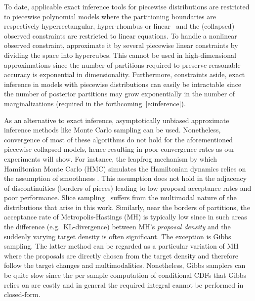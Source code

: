 \documentclass[letterpaper]{article}
\begin{document}
To date, applicable exact inference tools for piecewise distributions are restricted to piecewise polynomial models where the partitioning boundaries are  
respectively hyperrectangular, hyper-rhombus or linear~\cite{shenoy2011inference,shenoy2012two,Sanner:12}
and the (collapsed) observed constraints are restricted to linear equations.
To handle a nonlinear observed constraint,  
\cite{cobb2005nonlinear} approximate it by several piecewise linear constraints by dividing the space into hypercubes. This cannot be used in high-dimensional approximations since the number of partitions required to preserve reasonable accuracy is exponential in dimensionality.
Furthermore, constraints aside, exact inference in models with piecewise distributions can easily be intractable since the number of posterior partitions may grow exponentially in the number of marginalizations (required in the forthcoming~\eqref{e:inference}). 

As an alternative to exact inference, asymptotically unbiased
approximate inference methods like Monte Carlo sampling can be used.
Nonetheless, convergence of most of these algorithms do not hold for
the aforementioned piecewise collapsed models, hence resulting in poor
convergence rates as our experiments will show.
For instance, the leapfrog mechanism by which Hamiltonian Monte Carlo
(HMC) simulates the Hamiltonian dynamics relies on the assumption of
smoothness \cite{neal2011mcmc}.  This assumption does not hold in the
adjacency of discontinuities (borders of pieces) leading to low
proposal acceptance rates and poor performance.  Slice
sampling~\cite{Neal2003} suffers from the multimodal nature of the
distributions that arise in this work. Similarly, near the
borders of partitions, the acceptance rate of Metropolis-Hastings (MH)
is typically low since in such areas the difference
(e.g.\ KL-divergence) between MH’s \emph{proposal density} and the
suddenly varying target density is often significant.  The exception
is Gibbs sampling. The latter method can be regarded as a particular
variation of MH where the proposals are directly chosen from the
target density and therefore follow the target changes and
multimodalities.  Nonetheless, Gibbs samplers can be quite slow since
the per sample computation of conditional CDFs that Gibbs relies on
are costly and in general the required integral
cannot be performed in closed-form.
\end{document}
